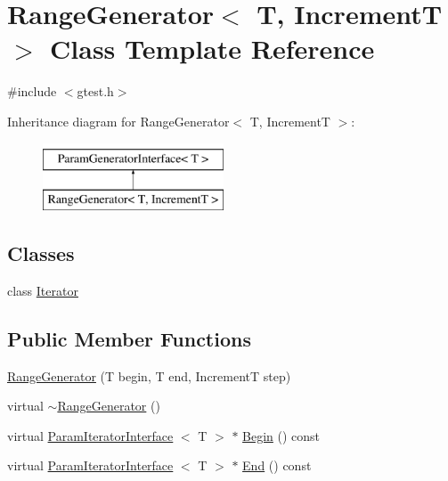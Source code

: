 \hypertarget{classtesting_1_1internal_1_1RangeGenerator}{\section{\-Range\-Generator$<$ \-T, \-Increment\-T $>$ \-Class \-Template \-Reference}
\label{d0/d50/classtesting_1_1internal_1_1RangeGenerator}
}


{\ttfamily \#include $<$gtest.\-h$>$}

\-Inheritance diagram for \-Range\-Generator$<$ \-T, \-Increment\-T $>$\-:\begin{figure}[H]
\begin{center}
\leavevmode
\includegraphics[height=2.000000cm]{d0/d50/classtesting_1_1internal_1_1RangeGenerator}
\end{center}
\end{figure}
\subsection*{\-Classes}
\begin{DoxyCompactItemize}
\item 
class \hyperlink{classtesting_1_1internal_1_1RangeGenerator_1_1Iterator}{\-Iterator}
\end{DoxyCompactItemize}
\subsection*{\-Public \-Member \-Functions}
\begin{DoxyCompactItemize}
\item 
\hyperlink{classtesting_1_1internal_1_1RangeGenerator_a95115d98491fb3611cee053f42e09f4b}{\-Range\-Generator} (\-T begin, \-T end, \-Increment\-T step)
\item 
virtual \hyperlink{classtesting_1_1internal_1_1RangeGenerator_a67b95870b992f5e10d520f8bff0b8a59}{$\sim$\-Range\-Generator} ()
\item 
virtual \hyperlink{classtesting_1_1internal_1_1ParamIteratorInterface}{\-Param\-Iterator\-Interface}\*
$<$ \-T $>$ $\ast$ \hyperlink{classtesting_1_1internal_1_1RangeGenerator_a9a158e0a461a4980161d14978995ecee}{\-Begin} () const 
\item 
virtual \hyperlink{classtesting_1_1internal_1_1ParamIteratorInterface}{\-Param\-Iterator\-Interface}\*
$<$ \-T $>$ $\ast$ \hyperlink{classtesting_1_1internal_1_1RangeGenerator_a4dd9259ea3453866b5475f17f27d8370}{\-End} () const 
\end{DoxyCompactItemize}
